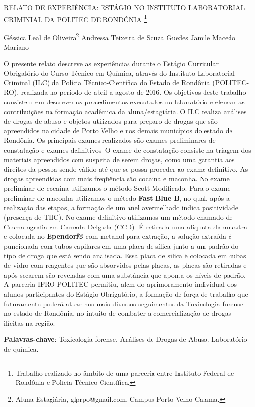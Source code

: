 \documentclass[article,12pt,onesidea,4paper,english,brazil]{abntex2}
\begin{document}
	
	
	\frenchspacing 
	
	\begin{center}
		\LARGE RELATO DE EXPERIÊNCIA: ESTÁGIO NO INSTITUTO LABORATORIAL CRIMINIAL DA POLITEC DE RONDÔNIA \footnote{Trabalho realizado no âmbito de uma parceria entre Instituto Federal de Rondônia e Policia Técnico-Científica.}
		
		\normalsize
		Géssica Leal de Oliveira\footnote{Aluna Estagiária, glprpo@gmail.com, Campus Porto Velho Calama.} 
		Andressa Teixeira de Souza Guedes 
		Jamile Macedo Mariano 
		
	\end{center}
	
	\noindent O presente relato descreve as experiências durante o Estágio Curricular Obrigatório do Curso Técnico em Química, através do Instituto Laboratorial Criminal (ILC) da Polícia Técnico-Científica do Estado de Rondônia (POLITEC-RO), realizada no período de abril a agosto de 2016. Os objetivos deste trabalho consistem em descrever os procedimentos executados no laboratório e elencar as contribuições na formação acadêmica da aluna/estagiária. O ILC realiza análises de drogas de abuso e objetos utilizados para preparo de drogas que são apreendidos na cidade de Porto Velho e nos demais municípios do estado de Rondônia. Os principais exames realizados são exames preliminares de constatação e exames definitivos. O exame de constatação consiste na triagem dos materiais apreendidos com suspeita de serem drogas, como uma garantia aos direitos da pessoa sendo válido até que se possa proceder ao exame definitivo. As drogas apreendidas com mais freqüência são cocaína e maconha. No exame preliminar de cocaína utilizamos o método Scott Modificado. Para o exame preliminar de maconha utilizamos o método\textbf{ Fast Blue B}, no qual, após a realização das etapas, a formação de um anel avermelhado indica positividade (presença de THC). No exame definitivo utilizamos um método chamado de Cromatografia em Camada Delgada (CCD). É retirada uma alíquota da amostra e colocada no \textbf{Ependorf®} com metanol para extração, a solução extraída é puncionada com tubos capilares em uma placa de sílica junto a um padrão do tipo de droga que está sendo analisada. Essa placa de sílica é colocada em cubas de vidro com reagentes que são absorvidos pelas placas, as placas são retiradas e após secarem são reveladas com uma substância que aponta os níveis de padrão. A parceria IFRO-POLITEC permitiu, além do aprimoramento individual dos alunos participantes do Estágio Obrigatório, a formação de força de trabalho que futuramente poderá atuar nos mais diversos seguimentos da Toxicologia forense no estado de Rondônia, no intuito de combater a comercialização de drogas ilícitas na região.
	
	\vspace{\onelineskip}
	
	\noindent
	\textbf{Palavras-chave}: Toxicologia forense. Análises de Drogas de Abuso. Laboratório de química.
	
\end{document}
